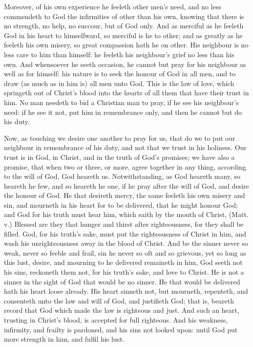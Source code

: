 Moreover, of his own experience he feeleth other men's
need, and no less commendeth to God the infirmities of 
other than his own, knowing that there is no strength, no 
help, no succour, but of God only. And as merciful as 
he feeleth God in his heart to himselfward, so merciful is 
he to other; and as greatly as he feeleth his own misery, 
so great compassion hath he on other. His neighbour is 
no less care to him than himself: he feeleth his neighbour's 
grief no less than his own. And whensoever he seeth occasion,
he cannot but pray for his neighbour as well as 
for himself: his nature is to seek the honour of God in 
all men, and to draw (as much as in him is) all men unto 
God. This is the law of love, which springeth out of 
Christ's blood into the hearts of all them that have their 
trust in him. No man needeth to bid a Christian man to pray, 
if he see his neighbour's need: if he see it not, put him in 
remembrance only, and then he cannot but do his duty. 

Now, as touching we desire one another to pray for us, 
that do we to put our neighbour in remembrance of his 
duty, and not that we trust in his holiness. Our trust is 
in God, in Christ, and in the truth of God's promises; 
we have also a promise, that when two or three, or more, 
agree together in any thing, according to the will of God, 
God heareth us. Notwithstanding, as God heareth many, 
so heareth he few, and so heareth he one, if he pray after 
the will of God, and desire the honour of God. He that 
desireth mercy, the same feeleth his own misery and sin, 
and mourneth in his heart for to be delivered, that he 
might honour God; and God for his truth must hear him, 
which saith by the mouth of Christ, (Matt. v.) Blessed are 
they that hunger and thirst after righteousness, for they 
shall be filled. God, for his truth's sake, must put the 
righteousness of Christ in him, and wash his unrighteousness
away in the blood of Christ. And be the sinner never 
so weak, never so feeble and frail, sin he never so oft and 
so grievous, yet so long as this lust, desire, and mourning 
to he delivered remaineth in him, God seeth not his sins, 
reckoneth them not, for his truth's sake, and love to 
Christ. He is not a sinner in the sight of God that would 
be no sinner. He that would be delivered hath his heart 
loose already. His heart sinneth not, but mourneth, repenteth,
and consenteth unto the law and will of God, and 
justifieth God; that is, beareth record that God which 
made the law is righteous and just. And such an heart, 
trusting in Christ's blood, is accepted for full righteous. 
And his weakness, infirmity, and frailty is pardoned, and 
his sins not looked upon: until God put more strength in 
him, and fulfil his lust. 

